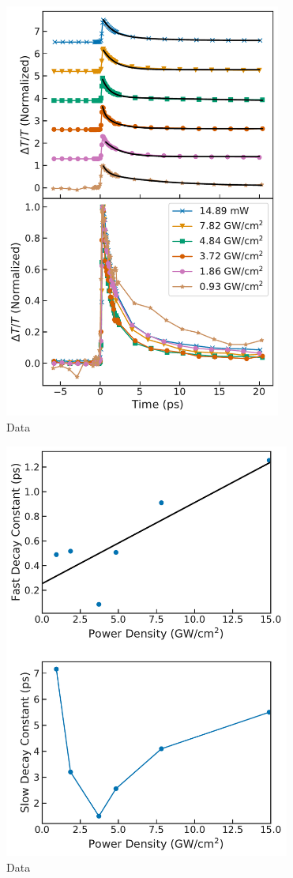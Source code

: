 \begin{figure}[ht]
	\centering
	\includegraphics[height=5.4in]{images/chapter_my_data/Weilu_CNT_diff_trans_fits_and_normalized}
	\caption{Data}
\end{figure}




\begin{figure}[ht]
	\centering
	\includegraphics[height=5.4in]{images/chapter_my_data/Weilu_CNT_Fast_Slow_Decay_Const}
	\caption{Data}
\end{figure}


